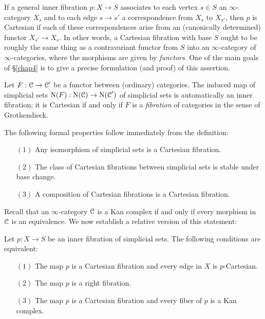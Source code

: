 If a general inner fibration $p: X \rightarrow S$ associates to each vertex $s \in S$ an $\infty$-category $X_{s}$ and to each edge $s \rightarrow s'$ a correspondence from $X_{s}$ to $X_{s'}$, then $p$ is Cartesian if each of these correspondences arise from an (canonically determined) functor $X_{s'} \rightarrow X_{s}$. In other words, a Cartesian fibration with base $S$ ought to be roughly the same thing as a contravariant functor from $S$ into an $\infty$-category of $\infty$-categories, where the morphisms are given by {\em functors}. 
One of the main goals of \S \ref{chap4} is to give a precise formulation
(and proof) of this assertion.

\begin{remark}\label{gcart}
Let $F: \operatorname{\mathcal{C}} \rightarrow \operatorname{\mathcal{C}}'$ be a functor between (ordinary) categories. The induced map of simplicial sets $\operatorname{N}(F): \operatorname{N}(\operatorname{\mathcal{C}}) \rightarrow \operatorname{N}(\operatorname{\mathcal{C}}')$ of simplicial sets is automatically an inner fibration; it is Cartesian if and only if $F$ is a {\it fibration} of categories in the sense of Grothendieck.
\end{remark}

The following formal properties follow immediately from the definition:

\begin{proposition}
\begin{itemize}
\item[$(1)$] Any isomorphism of simplicial sets is a Cartesian fibration.

\item[$(2)$] The class of Cartesian fibrations between simplicial sets is stable under base change.

\item[$(3)$] A composition of Cartesian fibrations is a Cartesian fibration.
\end{itemize}
\end{proposition}


Recall that an $\infty$-category $\operatorname{\mathcal{C}}$ is a Kan complex if and only if every morphism in $\operatorname{\mathcal{C}}$ is an equivalence. We now establish a relative version of this statement:

\begin{proposition}\label{goey}
Let $p: X \rightarrow S$ be an inner fibration of simplicial sets. The following
conditions are equivalent:
\begin{itemize}
\item[$(1)$] The map $p$ is a Cartesian fibration and every edge in $X$ is
$p$-Cartesian.

\item[$(2)$] The map $p$ is a right fibration.

\item[$(3)$] The map $p$ is a Cartesian fibration and every fiber of $p$ is a Kan
complex.
\end{itemize}
\end{proposition}

